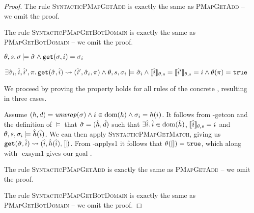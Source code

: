 \begin{proof}
The rule \textsc{SyntacticPMapGetAdd} is exactly the same as \textsc{PMapGetAdd} -- we omit the proof.

The rule \textsc{SyntacticPMapGetBotDomain} is exactly the same as \textsc{PMapGetBotDomain} -- we omit the proof.


\pfassume \begin{hypvlist}
 $\theta,s,\sigma \models \hat{\sigma} \land \texttt{get}(\sigma, i)=\sigma_i$
\end{hypvlist}
\pfprove \begin{goalvlist}
 $\exists \hat{\sigma}_i, \hat{i}, \hat{i}', \pi \ldotp \texttt{get}(\hat{\sigma},\hat{i})\rightsquigarrow(\hat{i}', \hat{\sigma}_i, \pi) \land \theta,s,\sigma_i\models\hat{\sigma}_i \land \llbracket\hat{i}\rrbracket_{\theta,s}=\llbracket\hat{i}'\rrbracket_{\theta,s}=i \land \theta(\pi)=\texttt{true}$
\end{goalvlist}

We proceed by proving the property holds for all rules of the concrete , resulting in three cases.


\begin{hypvlist}
 Assume $(h,d)={\operatorname{\mathit{unwrap}}}(\sigma) \land i\in\operatorname{dom}(h) \land \sigma_{i}=h(i)$.
 It follows from \hyp{getcon} and the definition of $\models$ that $\hat{\sigma}=(\hat{h}, \hat{d})$ such that $\exists \hat{i}\ldotp \hat{i} \in \operatorname{dom}(\hat{h})$, $\llbracket\hat{i}\rrbracket_{\theta,s}=i$ and $\theta,s,\sigma_i\models \hat{h}(\hat{i})$.
 We can then apply \textsc{SyntacticPMapGetMatch}, giving us $\texttt{get}(\hat{\sigma},\hat{i})\rightsquigarrow(\hat{i}, \hat{h}(\hat{i}), [])$.
 From \hyp{applys1} it follows that $\theta([])=\texttt{true}$, which along with \hyp{exsym1} gives our goal .
\end{hypvlist}

The rule \textsc{SyntacticPMapGetAdd} is exactly the same as \textsc{PMapGetAdd} -- we omit the proof.

The rule \textsc{SyntacticPMapGetBotDomain} is exactly the same as \textsc{PMapGetBotDomain} -- we omit the proof.

\end{proof}

